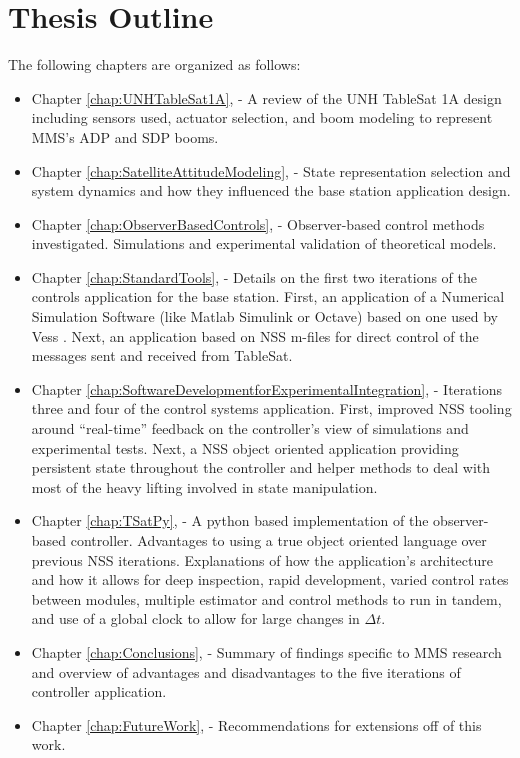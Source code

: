\section{Thesis Outline}
\label{sec:ThesisOutline}

The following chapters are organized as follows:

\begin{itemize}
    \item Chapter \ref{chap:UNHTableSat1A},  - A review of the UNH TableSat 1A design including sensors used, actuator selection, and boom modeling to represent MMS's ADP and SDP booms.
    \item Chapter \ref{chap:SatelliteAttitudeModeling},  -  State representation selection and system dynamics and how they influenced the base station application design.
    \item Chapter \ref{chap:ObserverBasedControls},  - Observer-based control methods investigated.  Simulations and experimental validation of theoretical models.
    \item Chapter \ref{chap:StandardTools},  - Details on the first two iterations of the controls application for the base station.  First, an application of a Numerical Simulation Software (like Matlab Simulink or Octave) based on one used by Vess \cite{vessthesis}.  Next, an application based on NSS m-files for direct control of the messages sent and received from TableSat.
    \item Chapter \ref{chap:SoftwareDevelopmentforExperimentalIntegration},  - Iterations three and four of the control systems application.  First, improved NSS tooling around ``real-time'' feedback on the controller's view of simulations and experimental tests.  Next, a NSS object oriented application providing persistent state throughout the controller and helper methods to deal with most of the heavy lifting involved in state manipulation.
    \item Chapter \ref{chap:TSatPy},  - A python based implementation of the observer-based controller.  Advantages to using a true object oriented language over previous NSS iterations.  Explanations of how the application's architecture and how it allows for deep inspection, rapid development, varied control rates between modules, multiple estimator and control methods to run in tandem, and use of a global clock to allow for large changes in $\Delta t$.
    \item Chapter \ref{chap:Conclusions},  - Summary of findings specific to MMS research and overview of advantages and disadvantages to the five iterations of controller application.
    \item Chapter \ref{chap:FutureWork},  - Recommendations for extensions off of this work.
\end{itemize}
